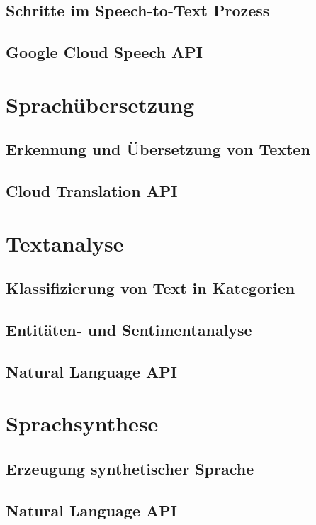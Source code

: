 \documentclass[12pt,a4paper]{article}
\begin{document}
\subsection{Schritte im Speech-to-Text Prozess}
\subsection{Google Cloud Speech API}


\newpage

\section{Sprachübersetzung}
\subsection{Erkennung und Übersetzung von Texten}
\subsection{Cloud Translation API}

\newpage

\section{Textanalyse}
\subsection{Klassifizierung von Text in Kategorien}
\subsection{Entitäten- und Sentimentanalyse}
\subsection{Natural Language API}

\newpage

\section{Sprachsynthese}
\subsection{Erzeugung synthetischer Sprache}
\subsection{Natural Language API}



\newpage
	
\end{document}
